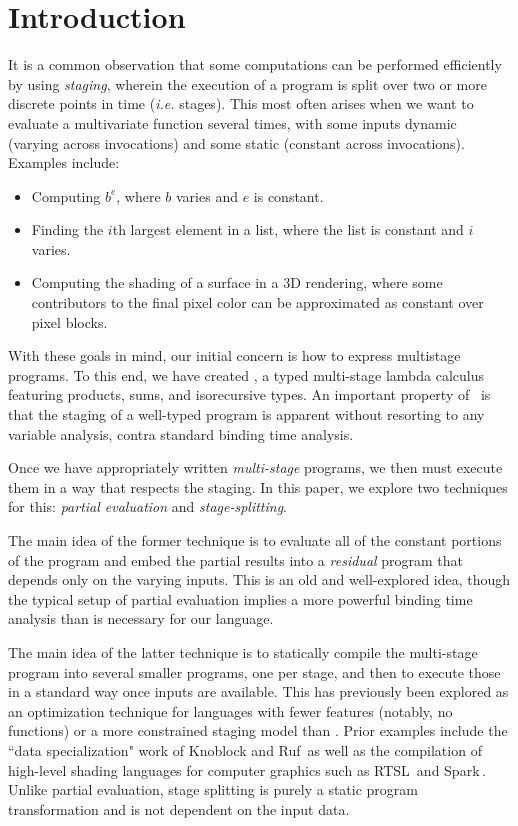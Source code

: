 \section{Introduction}

It is a common observation that some computations can be performed efficiently by using {\em staging}, wherein the execution of a program is split over two or more discrete points in time ({\em i.e.} stages).  This most often arises when we want to evaluate a multivariate function several times, with some inputs dynamic (varying across invocations) and some static (constant across invocations).  Examples include:
\begin{itemize}
\item Computing $b^e$, where $b$ varies and $e$ is constant.
\item Finding the $i$th largest element in a list, where the list is constant and $i$ varies.
\item Computing the shading of a surface in a 3D rendering, where some contributors to the final pixel color can be approximated as constant over  pixel blocks.  
\end{itemize}

With these goals in mind, our initial concern is how to express multistage programs. To this end, we have created \lang, a typed multi-stage lambda calculus featuring products, sums, and isorecursive types. An important property of \lang\ is that the staging of a well-typed program is apparent without resorting to any variable analysis, contra standard binding time analysis.  

Once we have appropriately written {\em multi-stage} programs, we then must execute them in a way that respects the staging.  In this paper, we explore two techniques for this: {\em partial evaluation} and {\em stage-splitting}.  

The main idea of the former technique is to evaluate all of the constant portions of the program and embed the partial results into a {\em residual} program that depends only on the varying inputs.  This is an old and well-explored idea, though the typical setup of partial evaluation implies a more powerful binding time analysis than is necessary for our language.

The main idea of the latter technique is to statically compile the multi-stage program into several smaller programs, one per stage, and then to execute those in a standard way once inputs are available.  This has previously been explored as an optimization technique for languages with fewer features (notably, no functions) or a more constrained staging model than \lang. Prior examples include the ``data specialization" work of Knoblock and Ruf\,\cite{knoblock96} as well as the compilation of high-level shading languages for computer graphics such as RTSL\,\cite{Proudfoot:2001} and Spark\,\cite{Foley:2011}.  Unlike partial evaluation, stage splitting is purely a static program transformation and is not dependent on the input data.

